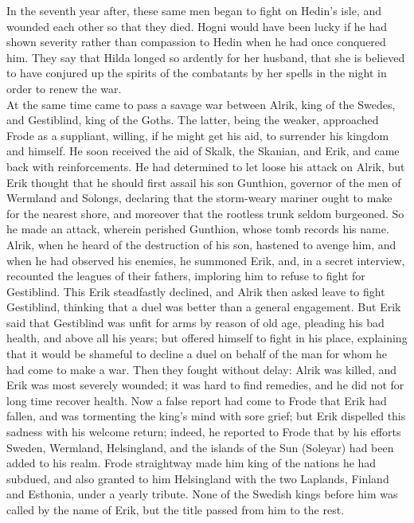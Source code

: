 \documentclass[10pt,a4paper]{report}
\begin{document}
In the seventh year after, these same men began to fight on Hedin's isle, and wounded each other so that they died. Hogni would have been lucky if he had shown severity rather than compassion to Hedin when he had once conquered him. They say that Hilda longed so ardently for her husband, that she is believed to have conjured up the spirits of the combatants by her spells in the night in order to renew the war.\\

At the same time came to pass a savage war between Alrik, king of the Swedes, and Gestiblind, king of the Goths. The latter, being the weaker, approached Frode as a suppliant, willing, if he might get his aid, to surrender his kingdom and himself. He soon received the aid of Skalk, the Skanian, and Erik, and came back with reinforcements. He had determined to let loose his attack on Alrik, but Erik thought that he should first assail his son Gunthion, governor of the men of Wermland and Solongs, declaring that the storm-weary mariner ought to make for the nearest shore, and moreover that the rootless trunk seldom burgeoned. So he made an attack, wherein perished Gunthion, whose tomb records his name. Alrik, when he heard of the destruction of his son, hastened to avenge him, and when he had observed his enemies, he summoned Erik, and, in a secret interview, recounted the leagues of their fathers, imploring him to refuse to fight for Gestiblind. This Erik steadfastly declined, and Alrik then asked leave to fight Gestiblind, thinking that a duel was better than a general engagement. But Erik said that Gestiblind was unfit for arms by reason of old age, pleading his bad health, and above all his years; but offered himself to fight in his place, explaining that it would be shameful to decline a duel on behalf of the man for whom he had come to make a war. Then they fought without delay: Alrik was killed, and Erik was most severely wounded; it was hard to find remedies, and he did not for long time recover health. Now a false report had come to Frode that Erik had fallen, and was tormenting the king's mind with sore grief; but Erik dispelled this sadness with his welcome return; indeed, he reported to Frode that by his efforts Sweden, Wermland, Helsingland, and the islands of the Sun (Soleyar) had been added to his realm. Frode straightway made him king of the nations he had subdued, and also granted to him Helsingland with the two Laplands, Finland and Esthonia, under a yearly tribute. None of the Swedish kings before him was called by the name of Erik, but the title passed from him to the rest.\\
\end{document}
